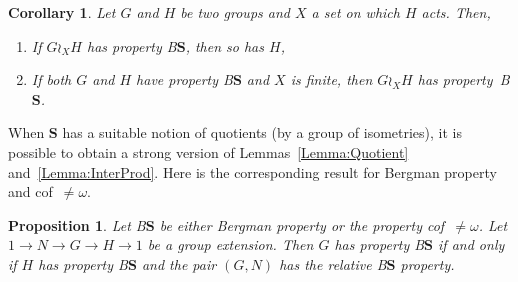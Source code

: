 \documentclass[a4paper]{article}
\newcommand{\PH}[1]{\todo[color={blue!33},size=small]{#1}}
\newtheorem{cor}[lem]{Corollary}
\newtheorem{prop}[lem]{Proposition}
\theoremstyle{definition}
\newcommand*{\BS}{B$\mathbf{S}$}
\begin{document}
\begin{cor}\label{Cor:Wreath}
Let $G$ and $H$ be two groups and $X$ a set on which $H$ acts. Then,
\begin{enumerate}
\item
If $G\wr_X H$ has property \BS, then so has $H$,
\item
If both $G$ and $H$ have property \BS{} and $X$ is finite, then $G\wr_X H$ has property~\BS.
\end{enumerate}
\end{cor}
%
%
When $\mathbf{S}$ has a suitable notion of quotients (by a group of isometries), it is possible to obtain a strong version of Lemmas~\ref{Lemma:Quotient} and~\ref{Lemma:InterProd}.
Here is the corresponding result for Bergman property and cof~$\neq\omega$.%
%
%
\begin{prop}\label{Prop:Extension}
Let \BS{} be either Bergman property or the property cof~$\neq\omega$.
Let $1\to N\to G\to H\to 1$ be a group extension.
Then $G$ has property \BS{} if and only if $H$ has property \BS{} and the pair $(G,N)$ has the relative \BS{} property.
\end{prop}
\end{document}
